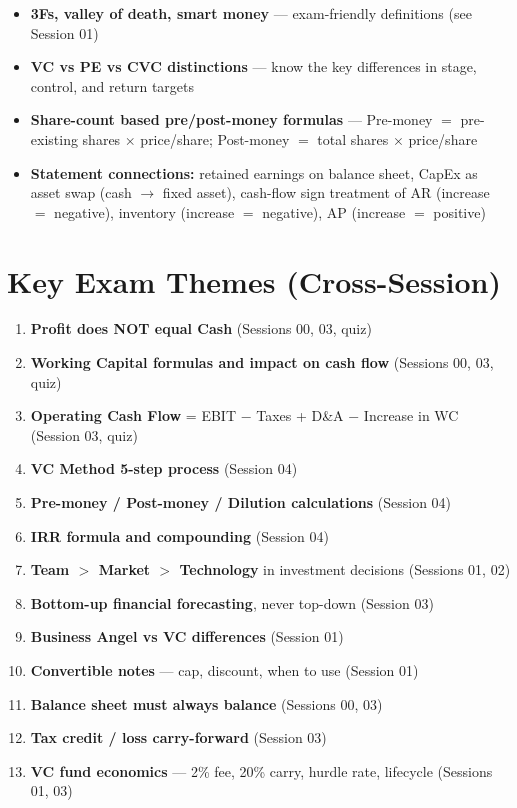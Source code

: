 \documentclass[a4paper,11pt]{article}
\begin{document}
\begin{itemize}
\item \textbf{3Fs, valley of death, smart money} --- exam-friendly definitions (see Session 01)
\item \textbf{VC vs PE vs CVC distinctions} --- know the key differences in stage, control, and return targets
\item \textbf{Share-count based pre/post-money formulas} --- Pre-money $=$ pre-existing shares $\times$ price/share; Post-money $=$ total shares $\times$ price/share
\item \textbf{Statement connections:} retained earnings on balance sheet, CapEx as asset swap (cash $\rightarrow$ fixed asset), cash-flow sign treatment of AR (increase $=$ negative), inventory (increase $=$ negative), AP (increase $=$ positive)
\end{itemize}

\newpage

\section{Key Exam Themes (Cross-Session)}

\begin{enumerate}
\item \textbf{Profit does NOT equal Cash} (Sessions 00, 03, quiz)
\item \textbf{Working Capital formulas and impact on cash flow} (Sessions 00, 03, quiz)
\item \textbf{Operating Cash Flow} = EBIT $-$ Taxes + D\&A $-$ Increase in WC (Session 03, quiz)
\item \textbf{VC Method 5-step process} (Session 04)
\item \textbf{Pre-money / Post-money / Dilution calculations} (Session 04)
\item \textbf{IRR formula and compounding} (Session 04)
\item \textbf{Team $>$ Market $>$ Technology} in investment decisions (Sessions 01, 02)
\item \textbf{Bottom-up financial forecasting}, never top-down (Session 03)
\item \textbf{Business Angel vs VC differences} (Session 01)
\item \textbf{Convertible notes} --- cap, discount, when to use (Session 01)
\item \textbf{Balance sheet must always balance} (Sessions 00, 03)
\item \textbf{Tax credit / loss carry-forward} (Session 03)
\item \textbf{VC fund economics} --- 2\% fee, 20\% carry, hurdle rate, lifecycle (Sessions 01, 03)
\end{enumerate}
\end{document}
